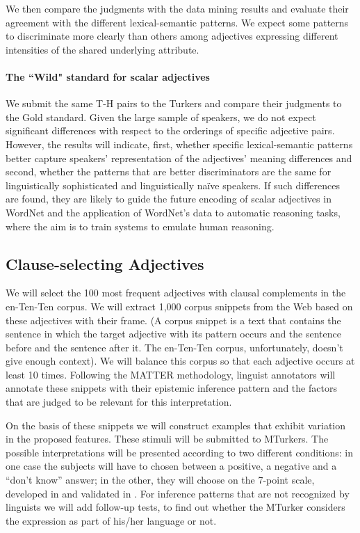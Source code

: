 \documentclass[10pt]{article}
\begin{document}
We then compare the judgments with the data mining results and evaluate their agreement with the different lexical-semantic patterns. 
We expect some patterns to discriminate more clearly than others among adjectives expressing different intensities of the shared underlying attribute. 

\paragraph{The ``Wild" standard for scalar adjectives}
We submit the same T-H pairs to the Turkers and compare their judgments to the Gold standard. Given the large sample 
of speakers, we do not expect significant differences with respect to the orderings of specific adjective pairs. However, 
the results will indicate, first, whether specific lexical-semantic patterns better capture speakers' representation of the adjectives' 
meaning differences and second, whether the patterns that are better discriminators are the same for linguistically 
sophisticated and linguistically na\"ive speakers. If such differences are found, they are likely to guide the future encoding of scalar adjectives 
in WordNet and the application of WordNet's data to automatic reasoning tasks, where the aim is to train systems to emulate human reasoning. 




\subsection{Clause-selecting Adjectives}

We will select the 100 most frequent adjectives with clausal complements in the en-Ten-Ten corpus. We will extract 1,000 corpus snippets from the Web based on these adjectives with their frame. (A corpus snippet is a text that contains the sentence in which the target adjective with its pattern occurs and the sentence before and the sentence after it. The en-Ten-Ten corpus, unfortunately, doesn’t give enough context). We will balance this corpus so that each adjective occurs at least 10 times. Following the MATTER methodology, linguist annotators will annotate these snippets with their epistemic inference pattern and the factors that are judged to be relevant for this interpretation.

On the basis of these snippets we will construct examples that exhibit variation in the proposed features. These stimuli will be submitted to MTurkers. 
The possible interpretations will be presented according to two different conditions: in one case the subjects will have to chosen between a positive, a negative and a ``don’t know'' answer; in the other, they will choose on the 7-point scale, developed in \cite{sauri:2008phd,sauri-pustejovsky2012} and validated in \cite{demarneff+manning+potts:2012}.
For inference patterns that are not recognized by linguists we will add follow-up tests, to find out whether the MTurker considers the expression as part of his/her language or not.
\end{document}
